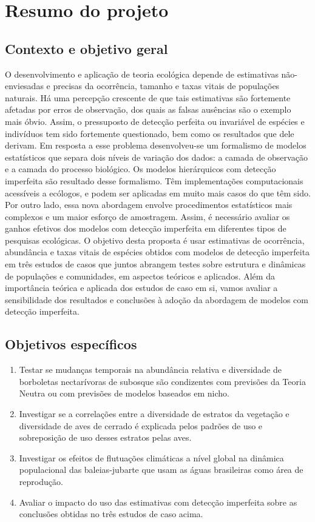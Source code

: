 \section{Resumo do projeto}


\subsection{Contexto e objetivo geral}
\label{sec:contexto} 

O desenvolvimento e aplicação de teoria ecológica depende de estimativas
não-enviesadas e precisas da ocorrência, tamanho e taxas vitais de
populações naturais. Há uma percepção crescente de que
tais estimativas são fortemente afetadas por erros de observação, dos
quais as falsas ausências são o exemplo mais óbvio. Assim, o
pressuposto de detecção perfeita ou invariável de espécies e
indivíduos tem sido fortemente questionado, bem como os resultados que
dele derivam. Em resposta a esse problema desenvolveu-se um formalismo
de modelos estatísticos que separa dois níveis de
variação dos dados: a camada de observação e a camada do processo
biológico. Os  modelos hierárquicos com detecção
imperfeita são resultado desse formalismo. Têm implementações
computacionais acessíveis a ecólogos, e podem ser aplicadas em muito
mais casos do que têm sido. Por outro lado, essa nova abordagem
envolve procedimentos estatísticos mais complexos e um maior esforço
de amostragem. Assim, é necessário avaliar os ganhos efetivos dos
modelos com detecção imperfeita em diferentes tipos de pesquisas
ecológicas. O objetivo desta proposta é usar estimativas de
ocorrência, abundância e taxas vitais de espécies obtidos com modelos
de detecção imperfeita em três estudos de casos que juntos abrangem
testes sobre estrutura e dinâmicas de populações e comunidades, em
aspectos teóricos e aplicados. Além da importância teórica e aplicada
dos estudos de caso em si, vamos avaliar a sensibilidade dos
resultados e conclusões à adoção da abordagem de modelos com detecção
imperfeita.


\subsection{Objetivos específicos}
\label{sec:especificos} 

\begin{enumerate}
\item Testar se mudanças temporais na abundância relativa e
  diversidade de borboletas nectarívoras de subosque  
  são condizentes com previsões da Teoria Neutra ou com
  previsões de modelos baseados em nicho. 
\item Investigar se a correlações entre a diversidade de estratos da
  vegetação e diversidade de aves de cerrado é explicada pelos padrões
  de uso e sobreposição de uso desses estratos pelas aves.
\item Investigar os efeitos de flutuações climáticas a nível global na
  dinâmica populacional das baleias-jubarte que usam as águas
  brasileiras como área de reprodução.
\item Avaliar o impacto do uso das estimativas com detecção imperfeita
  sobre as conclusões obtidas no três estudos de caso acima.
\end{enumerate}
